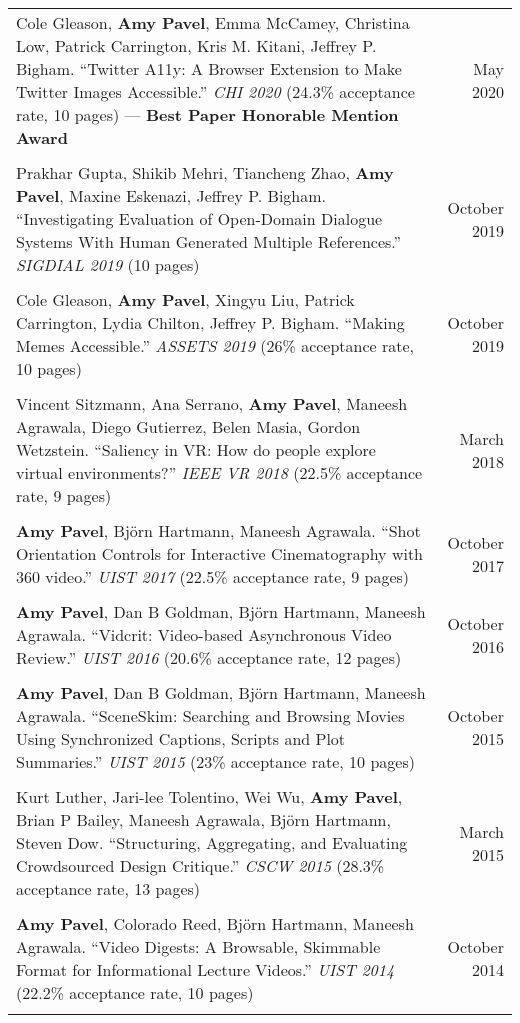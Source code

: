 \begin{longtable}{Xr}
	Cole Gleason, \textbf{Amy Pavel}, Emma McCamey, Christina Low, Patrick Carrington, Kris M. Kitani, Jeffrey P. Bigham. ``Twitter A11y: A Browser Extension to Make Twitter Images Accessible.'' \textit{CHI 2020} (24.3\% acceptance rate, 10 pages) --- \textbf{Best Paper Honorable Mention Award} & May 2020 \\
	\\

	Prakhar Gupta, Shikib Mehri, Tiancheng Zhao, \textbf{Amy Pavel}, Maxine Eskenazi, Jeffrey P. Bigham. ``Investigating Evaluation of Open-Domain Dialogue Systems With Human Generated Multiple References.'' \textit{SIGDIAL 2019} (10 pages) & October 2019 \\
	\\

	Cole Gleason, \textbf{Amy Pavel}, Xingyu Liu, Patrick Carrington, Lydia Chilton, Jeffrey P. Bigham. ``Making Memes Accessible.'' \textit{ASSETS 2019} (26\% acceptance rate, 10 pages) & October 2019 \\
	\\

	Vincent Sitzmann, Ana Serrano, \textbf{Amy Pavel}, Maneesh Agrawala, Diego Gutierrez, Belen Masia, Gordon Wetzstein. ``Saliency in VR: How do people explore virtual environments?'' \textit{IEEE VR 2018} (22.5\% acceptance rate, 9 pages) & March 2018 \\
	\\

	\textbf{Amy Pavel}, Björn Hartmann, Maneesh Agrawala. ``Shot Orientation Controls for Interactive Cinematography with 360 video.'' \textit{UIST 2017} (22.5\% acceptance rate, 9 pages) & October 2017 \\
	\\

	\textbf{Amy Pavel}, Dan B Goldman, Björn Hartmann, Maneesh Agrawala. ``Vidcrit: Video-based Asynchronous Video Review.'' \textit{UIST 2016} (20.6\% acceptance rate, 12 pages) & October 2016 \\
	\\

	\textbf{Amy Pavel}, Dan B Goldman, Björn Hartmann, Maneesh Agrawala. ``SceneSkim: Searching and Browsing Movies Using Synchronized Captions, Scripts and Plot Summaries.'' \textit{UIST 2015} (23\% acceptance rate, 10 pages) & October 2015 \\
	\\

	Kurt Luther, Jari-lee Tolentino, Wei Wu, \textbf{Amy Pavel}, Brian P Bailey, Maneesh Agrawala, Björn Hartmann, Steven Dow. ``Structuring, Aggregating, and Evaluating Crowdsourced Design Critique.'' \textit{CSCW 2015} (28.3\% acceptance rate, 13 pages) & March 2015 \\
	\\

	\textbf{Amy Pavel}, Colorado Reed, Björn Hartmann, Maneesh Agrawala. ``Video Digests: A Browsable, Skimmable Format for Informational Lecture Videos.'' \textit{UIST 2014} (22.2\% acceptance rate, 10 pages) & October 2014 \\
	\\

\end{longtable}